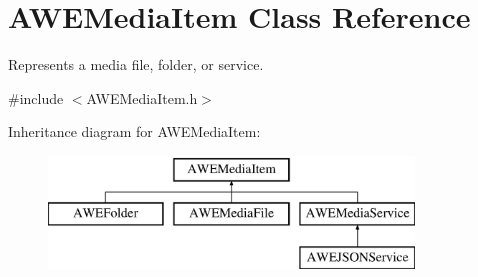 \hypertarget{class_a_w_e_media_item}{\section{A\-W\-E\-Media\-Item Class Reference}
\label{class_a_w_e_media_item}
}


Represents a media file, folder, or service.  




{\ttfamily \#include $<$A\-W\-E\-Media\-Item.\-h$>$}

Inheritance diagram for A\-W\-E\-Media\-Item\-:\begin{figure}[H]
\begin{center}
\leavevmode
\includegraphics[height=3.000000cm]{class_a_w_e_media_item}
\end{center}
\end{figure}
